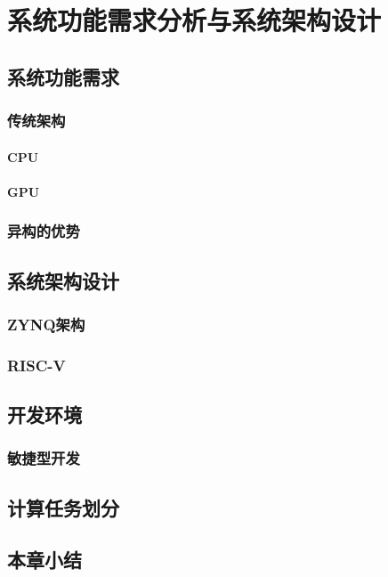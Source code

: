 \chapter{系统功能需求分析与系统架构设计}

\section{系统功能需求}
    \subsection{传统架构}
        \subsubsection{CPU}
        \subsubsection{GPU}
    \subsection{异构的优势}

\section{系统架构设计}
    \subsection{ZYNQ架构}
    \subsection{RISC-V}

\section{开发环境}
    \subsection{敏捷型开发}

\section{计算任务划分}

\section{本章小结}

